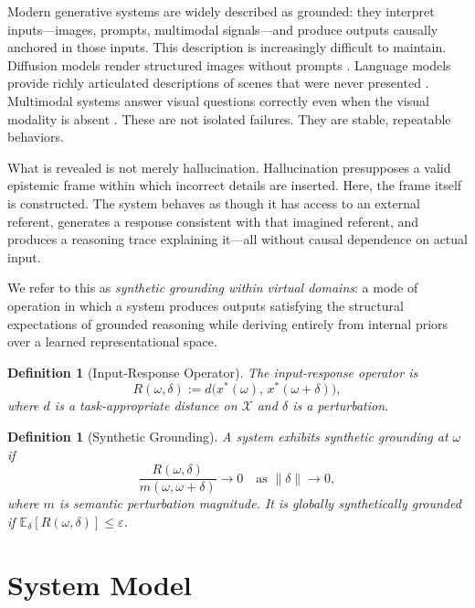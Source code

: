 \documentclass[twocolumn,10pt]{article}
\theoremstyle{thmstyle}
\theoremstyle{defstyle}
\newtheorem{definition}[theorem]{Definition}
\newcommand{\Xspace}{\mathcal{X}}
\newcommand{\Rop}{R}
\begin{document}
Modern generative systems are widely described as grounded: they
interpret inputs---images, prompts, multimodal signals---and produce
outputs causally anchored in those inputs. This description is
increasingly difficult to maintain. Diffusion models render structured
images without prompts \citep{ho2020ddpm,rombach2022ldm}. Language
models provide richly articulated descriptions of scenes that were never
presented \citep{brown2020gpt3}. Multimodal systems answer visual
questions correctly even when the visual modality is absent
\citep{asadi2026mirage}. These are not isolated failures. They are
stable, repeatable behaviors.

What is revealed is not merely hallucination. Hallucination presupposes
a valid epistemic frame within which incorrect details are inserted.
Here, the frame itself is constructed. The system behaves as though it
has access to an external referent, generates a response consistent with
that imagined referent, and produces a reasoning trace explaining
it---all without causal dependence on actual input.

We refer to this as \emph{synthetic grounding within virtual domains}:
a mode of operation in which a system produces outputs satisfying the
structural expectations of grounded reasoning while deriving entirely
from internal priors over a learned representational space.

\begin{definition}[Input-Response Operator]
\label{def:iro}
The \emph{input-response operator} is
\[
  \Rop(\omega,\delta) := d\!\bigl(x^*(\omega),\, x^*(\omega+\delta)\bigr),
\]
where $d$ is a task-appropriate distance on $\Xspace$ and $\delta$ is a
perturbation.
\end{definition}

\begin{definition}[Synthetic Grounding]
\label{def:sg}
A system exhibits \emph{synthetic grounding} at $\omega$ if
\[
  \frac{\Rop(\omega,\delta)}{m(\omega,\omega+\delta)} \to 0
  \quad\text{as } \|\delta\|\to 0,
\]
where $m$ is semantic perturbation magnitude. It is
\emph{globally synthetically grounded} if
$\mathbb{E}_{\delta}[\Rop(\omega,\delta)] \leq \varepsilon$.
\end{definition}

\section{System Model}
\label{sec:model}
\end{document}
